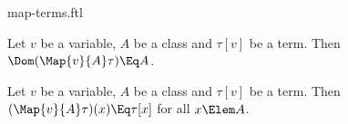 \documentclass{stex}
\begin{document}
\begin{smodule}{map-terms.ftl}


\begin{fakeforthel}
  \begin{axiom}
    Let $v$ be a variable, $A$ be a class and $\tau[v]$ be a term.
    Then $\Dom(\Map{v}{A}\tau) \Eq A$.
  \end{axiom}
\end{fakeforthel}

\begin{fakeforthel}
  \begin{axiom}
    Let $v$ be a variable, $A$ be a class and $\tau[v]$ be a term.
    Then $(\Map{v}{A}\tau)(x) \Eq \tau[x]$ for all $x \Elem A$.
  \end{axiom}
\end{fakeforthel}

\end{smodule}
\end{document}
